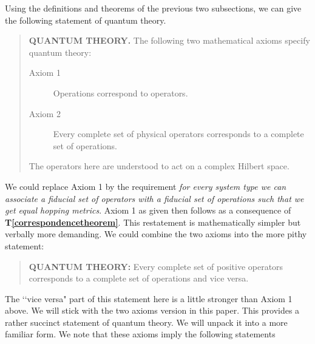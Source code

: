 \documentclass[10pt]{article}
\begin{document}
Using the definitions and theorems of the previous two subsections, we can give the following statement of quantum theory.
\begin{quote}
{\bf QUANTUM THEORY.}  The following two mathematical axioms specify quantum theory:
\begin{description}
\item[Axiom 1] Operations correspond to operators.
\item[Axiom 2] Every complete set of physical operators corresponds to a complete set of operations.
\end{description}
The operators here are understood to act on a complex Hilbert space.
\end{quote}
We could replace Axiom 1 by the requirement \emph{for every system type we can associate a fiducial set of operators with a fiducial set of operations such that we get equal hopping metrics}.  Axiom 1 as given then follows as a consequence of {\bf T\ref{correspondencetheorem}}.  This restatement is mathematically simpler but verbally more demanding.  We could combine the two axioms into the more pithy statement:
\begin{quote}
{\bf QUANTUM THEORY:} Every complete set of positive operators corresponds to a complete set of operations and vice versa.
\end{quote}
The \lq\lq vice versa" part of this statement here is a little stronger than Axiom 1 above. We will stick with the two axioms version in this paper. This provides a rather succinct statement of quantum theory.  We will unpack it into a more familiar form.  We note that these axioms imply the following statements
\end{document}
